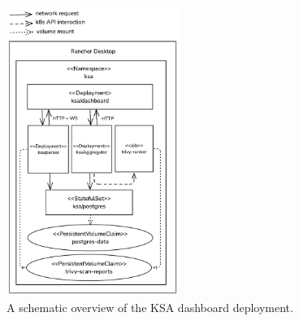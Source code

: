 \begin{figure}[!hbt]
	\begin{center}
		\includegraphics[width=0.5\textwidth]{images/ksa-schematic.png}
        \caption{A schematic overview of the KSA dashboard deployment.}
		\label{img:ksa-schematic-overview}
	\end{center}
\end{figure}